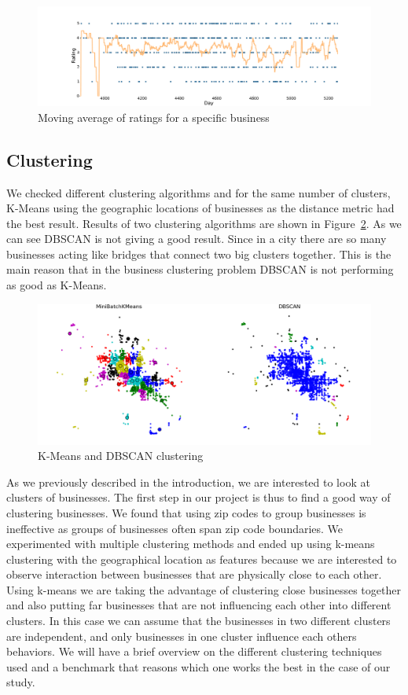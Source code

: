 \documentclass{vldb}
\begin{document}
\begin{figure}[h]
\centering
\includegraphics[width=\columnwidth]{moving_avg.pdf}
\caption{ Moving average of ratings for a specific business}
\label{fig:moving_average}
\end{figure}

\subsection{Clustering}
We checked different clustering algorithms and for the same number of clusters, K-Means using the geographic locations of businesses as the distance metric had the best result. Results of two clustering algorithms are shown in Figure~\ref{fig:clusters}. As we can see DBSCAN is not giving a good result. Since in a city there are so many businesses acting like bridges that connect two big clusters together. This is the main reason that in the business clustering problem DBSCAN is not performing as good as K-Means.

\begin{figure}[h]
\centering
\includegraphics[width=\columnwidth]{clusters.png}
\caption{ K-Means and DBSCAN clustering}
\label{fig:clusters}
\end{figure}

As we previously described in the introduction, we are interested to look at clusters of businesses.
The first step in our project is thus to find a good way of clustering businesses.
We found that using zip codes to group businesses is ineffective as groups of businesses often span zip code boundaries.
We experimented with multiple clustering methods and ended up using k-means clustering with the geographical location as features because we are interested to observe interaction between businesses that are physically close to each other. Using k-means we are taking the advantage of clustering close businesses together and also putting far businesses that are not influencing each other into different clusters. In this case we can assume that the businesses in two different clusters are independent, and only businesses in one cluster influence each others behaviors. We will have a brief overview on the different clustering techniques used and a benchmark that reasons which one works the best in the case of our study.
\end{document}
